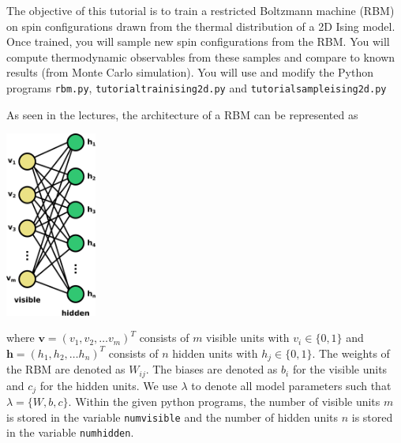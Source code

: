 \documentclass[letterpaper]{scrartcl}
\begin{document}

\vspace{-3cm}


\date{August 30, 2019}

\maketitle

The objective of this tutorial is to train a restricted Boltzmann machine (RBM) on spin configurations drawn from the thermal distribution
of a 2D Ising model.  Once trained, you will sample new spin configurations from the RBM.
You will compute thermodynamic observables from these samples and compare to known results (from Monte Carlo simulation).
You will use and modify the Python programs 
\texttt{rbm.py}, \texttt{tutorial{\textunderscore}train{\textunderscore}ising2d.py} and 
\texttt{tutorial{\textunderscore}sample{\textunderscore}ising2d.py} %

As seen in the lectures, the architecture of a RBM can be represented as
\begin{center}
\includegraphics[width=3cm]{RBM.pdf}
\end{center}
where $\mathbf{v} = \left(v_1, v_2, \ldots v_m\right)^T$ consists of $m$ visible units with $v_i \in \{0,1\}$ and $\mathbf{h} = \left(h_1, h_2, \ldots h_n\right)^T$ consists of $n$ hidden units with $h_j \in \{0,1\}$.
The weights of the RBM are denoted as $W_{ij}$. 
The biases are denoted as $b_i$ for the visible units and $c_j$ for the hidden units.
We use $\lambda$ to denote all model parameters such that $\lambda = \{ W, b, c \}$.
Within the given python programs, the number of visible units $m$ is stored in the variable \texttt{num{\textunderscore}visible}
and the number of hidden units $n$ is stored in the variable \texttt{num{\textunderscore}hidden}.
\end{document}
